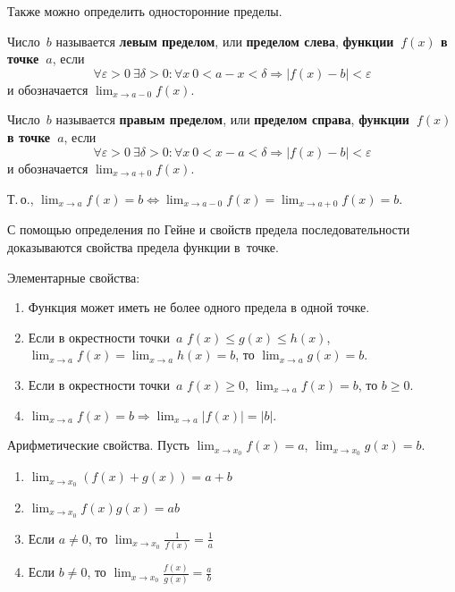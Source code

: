Также можно определить односторонние пределы.

Число~$b$ называется \textbf{левым пределом}, или \textbf{пределом слева}, \textbf{функции~$f(x)$ в точке~$a$}, если
\begin{equation*}
\forall \varepsilon > 0 \ \exists \delta > 0 \colon \forall x \ 0 < a - x < \delta \Rightarrow |f(x) - b| < \varepsilon
\end{equation*}
и обозначается $\displaystyle \lim_{x \to a-0} f(x)$.

Число~$b$ называется \textbf{правым пределом}, или \textbf{пределом справа}, \textbf{функции~$f(x)$ в точке~$a$}, если
\begin{equation*}
\forall \varepsilon > 0 \ \exists \delta > 0 \colon \forall x \ 0 < x - a < \delta \Rightarrow |f(x) - b| < \varepsilon
\end{equation*}
и обозначается $\displaystyle \lim_{x \to a+0} f(x)$.

Т.\,о., $\displaystyle \lim_{x \to a} f(x) = b \Leftrightarrow \lim_{x \to a-0} f(x) = \lim_{x \to a+0} f(x) = b$.

С помощью определения по Гейне и свойств предела последовательности доказываются свойства предела функции в~точке.

Элементарные свойства:
\begin{enumerate}
	\item Функция может иметь не более одного предела в одной точке.
	\item \begin{theorem}
	\label{th:about_two_policemen}
	Если в окрестности точки~$a$ $f(x) \leqslant g(x) \leqslant h(x)$, $\displaystyle \lim_{x \to a} f(x) = \lim_{x \to a} h(x) = b$, то $\displaystyle \lim_{x \to a} g(x) = b$.
	\end{theorem}
	\item Если в окрестности точки~$a$ $f(x) \geqslant 0$, $\displaystyle \lim_{x \to a} f(x) = b$, то $b \geqslant 0$.
	\item $\displaystyle \lim_{x \to a} f(x) = b \Rightarrow \lim_{x \to a} |f(x)| = |b|$.
\end{enumerate}

Арифметические свойства.
Пусть $\displaystyle \lim_{x \to x_0} f(x) = a$, $\displaystyle \lim_{x \to x_0} g(x) = b$.
\begin{enumerate}
	\item $\displaystyle \lim_{x \to x_0} (f(x) + g(x)) = a + b$
	\item $\displaystyle \lim_{x \to x_0} f(x)g(x) = ab$
	\item Если $a \neq 0$, то $\displaystyle \lim_{x \to x_0} \frac1{f(x)} = \frac1a$
	\item Если $b \neq 0$, то $\displaystyle \lim_{x \to x_0} \frac{f(x)}{g(x)} = \frac{a}b$
\end{enumerate}